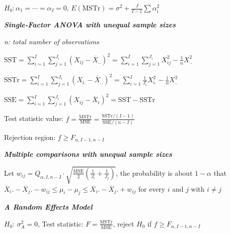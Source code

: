 \documentclass{article}
\newcommand{\smalltitle}[1]{
	\noindent
	\textbf{\textit{#1}}
}
\begin{document}
	$H_0: \alpha_1 = \cdots = \alpha_I = 0$, $E ( \mathrm { MSTr } ) = \sigma ^ { 2 } + \frac { J } { I - 1 } \sum \alpha _ { i } ^ { 2 }$
	
	\smalltitle{Single-Factor ANOVA with unequal sample sizes}
	
	\textit{n: total number of observations}
	
	$\mathrm { SST } = \sum \limits_ { i = 1 } ^ { I } \sum\limits _ { j = 1 } ^ { J _ { i } } \left( X _ { i j } - \overline { X }_ {..} \right) ^ { 2 } = \sum \limits_ { i = 1 } ^ { I } \sum \limits_ { j = 1 } ^ { J _ { i } } X _ { i j } ^ { 2 } - \frac { 1 } { n } X ^ { 2 }_{. .}$ 
	
	$\mathrm { SSTr } = \sum \limits_ { i = 1 } ^ { I } \sum \limits_ { j = 1 } ^ { J _ { i } } \left( X _ { i . } - \overline { X }_{. .} \right) ^ { 2 } = \sum \limits_ { i = 1 } ^ { I } \frac { 1 } { J _ { i } } X _ { i. } ^ { 2 } - \frac { 1 } { n } X ^ { 2 } _{..}$
	
	$\mathrm { SSE } = \sum \limits_ { i = 1 } ^ { I } \sum \limits_ { j = 1 } ^ { J _ { i } } \left( X _ { i j } - \overline { X } _ { i } \right) ^ { 2 } = \mathrm { SST } - \mathrm { SSTr }$
	
	Test statistic value: $f = \frac { \mathrm { MSTr } } { \mathrm { MSE } } = \frac{\mathrm{ SSTr }/(I-1)}{\mathrm{ SSE }/(n-I)}$
	
	Rejection region: $f \geq F _ { \alpha , I - 1 , n - I }$
	
	\smalltitle{Multiple comparisons with unequal sample sizes}
	
	Let $w _ { i j } = Q _ { \alpha , I , n - I } \cdot \sqrt { \frac { \mathrm { MSE } } { 2 } \left( \frac { 1 } { J _ { i } } + \frac { 1 } { J _ { j } } \right) }$, the probability is about $1-\alpha$ that $\overline { X } _ { i } . - \overline { X } _ { j } . - w _ { i j } \leq \mu _ { i } - \mu _ { j } \leq \overline { X } _ { i } . - \overline { X } _ { j } . + w _ { i j }$ for every $i$ and $j$ with $i\neq j$
	
	\smalltitle{A Random Effects Model}
	
	
	$H_0$: $\sigma _ { A } ^ { 2 } = 0$, Test statistic: $F = \frac{\mathrm{ MSTr }}{\mathrm{ MSE }}$, reject $H_0$ if $f \geq F _ { \alpha , I - 1 , n - I }$
	
\end{document}
